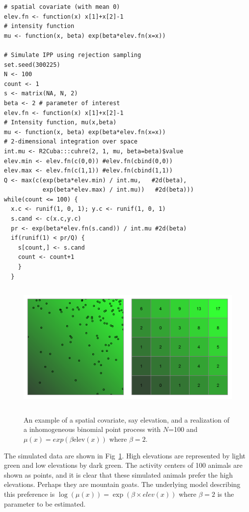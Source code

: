\begin{small}
\begin{verbatim}
# spatial covariate (with mean 0)
elev.fn <- function(x) x[1]+x[2]-1
# intensity function
mu <- function(x, beta) exp(beta*elev.fn(x=x))

# Simulate IPP using rejection sampling
set.seed(300225)
N <- 100
count <- 1
s <- matrix(NA, N, 2)
beta <- 2 # parameter of interest
elev.fn <- function(x) x[1]+x[2]-1
# Intensity function, mu(x,beta)
mu <- function(x, beta) exp(beta*elev.fn(x=x))
# 2-dimensional integration over space
int.mu <- R2Cuba:::cuhre(2, 1, mu, beta=beta)$value
elev.min <- elev.fn(c(0,0)) #elev.fn(cbind(0,0))
elev.max <- elev.fn(c(1,1)) #elev.fn(cbind(1,1))
Q <- max(c(exp(beta*elev.min) / int.mu,   #2d(beta),
           exp(beta*elev.max) / int.mu))   #2d(beta)))
while(count <= 100) {
  x.c <- runif(1, 0, 1); y.c <- runif(1, 0, 1)
  s.cand <- c(x.c,y.c)
  pr <- exp(beta*elev.fn(s.cand)) / int.mu #2d(beta)
  if(runif(1) < pr/Q) {
    s[count,] <- s.cand
    count <- count+1
    }
  }
\end{verbatim}
\end{small}


\begin{figure}
\centering
\includegraphics[width=5in,height=2.5in]{Ch11/figs/heteroPlots}
\label{ch9.fig.hetero}
\caption{An example of a spatial covariate, say elevation, and a
  realization of a inhomogeneous binomial point process with $N$=100
  and $\mu(x) = exp(\beta \mbox{elev}(x))$ where $\beta=2$.}
\end{figure}

The simulated data are shown in Fig~\ref{ch9.fig.hetero}. High elevations
are represented by light green and low elevations by dark green. The
activity centers of 100 animals are shown as
points, and it is clear that these simulated animals prefer the high
elevations.  Perhaps they are mountain goats. The underlying model describing this preference is
$\log(\mu(x)) = \exp(\beta \times elev(x))$
where $\beta=2$ is the parameter to be estimated.

